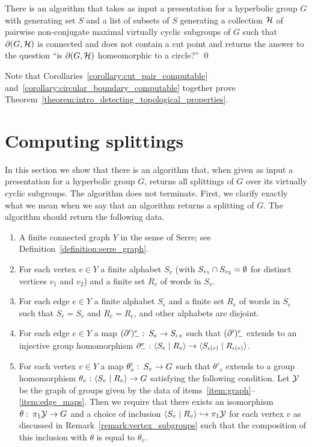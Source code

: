 \begin{corollary}\label{corollary:circular_boundary_computable} 
  There is an algorithm that takes as input a presentation for a hyperbolic group $G$ with generating set $S$ and a list of subsets of $S$ generating a collection $\mathcal{H}$ of pairwise non-conjugate maximal virtually cyclic subgroups of $G$ such that $\partial(G, \mathcal{H})$ is connected and does not contain a cut point and returns the answer to the question ``is\/ $\partial(G, \mathcal{H})$ homeomorphic to a circle?'' \qed 
\end{corollary}

Note that Corollaries~\ref{corollary:cut_pair_computable} and~\ref{corollary:circular_boundary_computable} together prove Theorem~\ref{theorem:intro_detecting_topological_properties}.

\section{Computing splittings}\label{section:computing_splittings}

In this section we show that there is an algorithm that, when given as input a presentation for a hyperbolic group $G$, returns all splittings of $G$ over its virtually cyclic subgroups. The algorithm does not terminate.
First, we clarify exactly what we mean when we say that an algorithm returns a splitting of $G$.
The algorithm should return the following data.

\begin{enumerate}
  \item \label{item:graph} A finite connected graph $Y$ in the sense of Serre; see Definition~\ref{definition:serre_graph}.
  \item For each vertex $v \in Y$ a finite alphabet $S_v$ (with $S_{v_1} \cap S_{v_2} = \emptyset$ for distinct vertices $v_1$ and $v_2$) and a finite set $R_v$ of words in $S_v$.
  \item For each edge $e \in Y$ a finite alphabet $S_e$ and a finite set $R_e$ of words in $S_e$ such that $S_{\bar{e}} = S_e$ and $R_{\bar{e}} = R_{e}$, and other alphabets are disjoint.
  \item \label{item:edge_maps} For each edge $e \in Y$ a map $(\partial')^e_{-} \operatorname{\colon} S_e \to S_{\operatorname{\iota} e}$ such that $(\partial')^e_{-}$ extends to an injective group homomorphism $\partial^e_{-} \operatorname{\colon} \langle S_e \mid R_e\rangle \to \langle S_{\operatorname{\iota}(e)} \mid R_{\operatorname{\iota}(e)}\rangle$.
  \item For each vertex $v \in Y$ a map $\theta'_v \operatorname{\colon} S_v \to G$ such that $\theta'_v$ extends to a group homomorphism $\theta_v \operatorname{\colon} \langle S_v \mid R_v\rangle \to G$ satisfying the following condition.
    Let $\mathcal{Y}$ be the graph of groups given by the data of items~\ref{item:graph}--\ref{item:edge_maps}.
    Then we require that there exists an isomorphism $\theta\operatorname{\colon}\pi_1\mathcal{Y}\to G$ and a choice of inclusion $\langle S_v \mid R_v\rangle \hookrightarrow \pi_1\mathcal{Y}$ for each vertex $v$ as discussed in Remark~\ref{remark:vertex_subgroups} such that the composition of this inclusion with $\theta$ is equal to $\theta_v$.
\end{enumerate}

